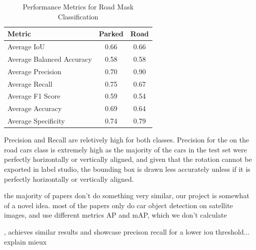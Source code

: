 \begin{table}[htbp]
    \centering
    \begin{tabular}{|l|c|c|}

    \hline
    \textbf{Metric}           & \textbf{Parked} & \textbf{Road} \\ \hline
    Average IoU               & 0.66            & 0.66          \\ \hline
    Average Balanced Accuracy & 0.58            & 0.58          \\ \hline
    Average Precision         & 0.70            & 0.90          \\ \hline
    Average Recall            & 0.75            & 0.67          \\ \hline
    Average F1 Score          & 0.59            & 0.54          \\ \hline
    Average Accuracy          & 0.69            & 0.64          \\ \hline
    Average Specificity       & 0.74            & 0.79          \\ \hline
  \end{tabular}
  \caption{Performance Metrics for Road Mask Classification}
  \label{tab:metrics1}
\end{table}

Precision and Recall are reletively high for both classes. Precision for the on the road cars class is extremely high as the majority of the cars in the test set were perfectly horizontally or vertically aligned, and given that the rotation cannot be exported in label studio, the bounding box is drawn less accurately unless if it is perfectly horizontally or vertically aligned.

the majority of papers don't do something very similar, our project is somewhat of a novel idea.
most of the papers only do car object detection on satellite images, and use different metrics AP and mAP, which we don't calculate

\cite{similarresults}, achieves similar results and showcase precison recall for a lower iou threshold... explain mieux

